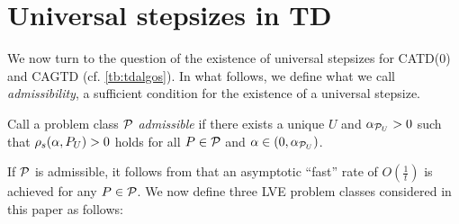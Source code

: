 \section{Universal stepsizes in TD}\label{sec:rl}
We now turn to the question of the existence of universal stepsizes for CATD(0) and CAGTD (cf. \cref{tb:tdalgos}). 
In what follows, we define what we call \emph{admissibility}, 
a sufficient condition for the existence of a universal stepsize. 
\begin{definition}\label{def:admis}
Call a problem class $\P$ \emph{admissible} if there exists a unique $U$ and $\alpha_{\P_U}>0$ such that
$\rhos{P_U}>0$ holds for all $P\in \P$ and $\alpha\in(0,\alpha_{\P_U})$.
\end{definition}
If $\P$ is admissible, it  follows from  that an asymptotic ``fast'' rate of $O(\frac1t)$ is achieved for any $P\in \cP$.
We now define three LVE problem classes considered in this paper as follows:
\begin{comment}
\begin{table}
\resizebox{\columnwidth}{!}{
\begin{tabular}{|c|c|c|c|}\hline
Class &Fixed &Variable &Remark\\\hline
$\P_{TDON}$ & $\Phi,S,A,\gamma$ & $\pi,P,R$ &$\mu=d_{\pi}, \EE{\phi_t\phi_t}=\EE{\phi'_t\phi'_t}$\\\hline
$\P_{TDOFF}$ & $\Phi,S,A,\gamma$ & $\pi,\mu,P,R$ &$\mu\neq d_{\pi}, \EE{\phi_t\phi_t}=\EE{\phi'_t\phi'_t}$, $\norm{\phi_t}=1$\\\hline
$\P_{GTDOFF}$ & $\Phi,S,A,\gamma$ & $\pi,\mu,P,R$ &$\mu\neq d_{\pi}$\\\hline
\end{tabular}
}
\end{table}
\end{comment}
\FloatBarrier
\begin{table}[h]
\caption{Here, $S,A,\gamma$ are fixed across all the class and the second column shows the quantities that vary across the respective classes. These three capture \emph{on/off-policy} learning scenarios arising in RL.}
\end{table}
